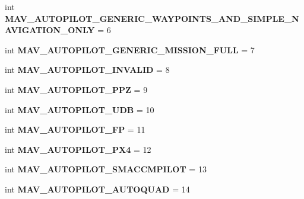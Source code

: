 \begin{DoxyCompactItemize}
int {\bfseries M\+A\+V\+\_\+\+A\+U\+T\+O\+P\+I\+L\+O\+T\+\_\+\+G\+E\+N\+E\+R\+I\+C\+\_\+\+W\+A\+Y\+P\+O\+I\+N\+T\+S\+\_\+\+A\+N\+D\+\_\+\+S\+I\+M\+P\+L\+E\+\_\+\+N\+A\+V\+I\+G\+A\+T\+I\+O\+N\+\_\+\+O\+N\+LY} = 6
\item 
\mbox{\label{namespacepymavlink_1_1dialects_1_1v10_a4c2ce62a5fa02d5b7e958d44d98f63a2}} 
int {\bfseries M\+A\+V\+\_\+\+A\+U\+T\+O\+P\+I\+L\+O\+T\+\_\+\+G\+E\+N\+E\+R\+I\+C\+\_\+\+M\+I\+S\+S\+I\+O\+N\+\_\+\+F\+U\+LL} = 7
\item 
\mbox{\label{namespacepymavlink_1_1dialects_1_1v10_a0593d4f35f6803400df48fe4d3706613}} 
int {\bfseries M\+A\+V\+\_\+\+A\+U\+T\+O\+P\+I\+L\+O\+T\+\_\+\+I\+N\+V\+A\+L\+ID} = 8
\item 
\mbox{\label{namespacepymavlink_1_1dialects_1_1v10_a42358f66ce7d89cd2496f7245e745dcf}} 
int {\bfseries M\+A\+V\+\_\+\+A\+U\+T\+O\+P\+I\+L\+O\+T\+\_\+\+P\+PZ} = 9
\item 
\mbox{\label{namespacepymavlink_1_1dialects_1_1v10_ae2e96b3513b791b918f85de9316bd6c2}} 
int {\bfseries M\+A\+V\+\_\+\+A\+U\+T\+O\+P\+I\+L\+O\+T\+\_\+\+U\+DB} = 10
\item 
\mbox{\label{namespacepymavlink_1_1dialects_1_1v10_a1e45030d9d2dd155302c147a752cfc8b}} 
int {\bfseries M\+A\+V\+\_\+\+A\+U\+T\+O\+P\+I\+L\+O\+T\+\_\+\+FP} = 11
\item 
\mbox{\label{namespacepymavlink_1_1dialects_1_1v10_a5ba212f9776f6e4410bd4a0b319ca0c2}} 
int {\bfseries M\+A\+V\+\_\+\+A\+U\+T\+O\+P\+I\+L\+O\+T\+\_\+\+P\+X4} = 12
\item 
\mbox{\label{namespacepymavlink_1_1dialects_1_1v10_a2dc7d7ba18101bb72c9d0917e2a52e64}} 
int {\bfseries M\+A\+V\+\_\+\+A\+U\+T\+O\+P\+I\+L\+O\+T\+\_\+\+S\+M\+A\+C\+C\+M\+P\+I\+L\+OT} = 13
\item 
\mbox{\label{namespacepymavlink_1_1dialects_1_1v10_abd325ed8ad18741d05e1a7f12f60167b}} 
int {\bfseries M\+A\+V\+\_\+\+A\+U\+T\+O\+P\+I\+L\+O\+T\+\_\+\+A\+U\+T\+O\+Q\+U\+AD} = 14

\end{DoxyCompactItemize}
